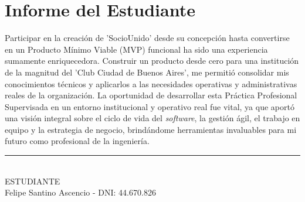 \section{Informe del Estudiante}

Participar en la creación de 'SocioUnido' desde su concepción hasta convertirse en un Producto Mínimo Viable (MVP) funcional ha sido una experiencia sumamente enriquecedora. Construir un producto desde cero para una institución de la magnitud del 'Club Ciudad de Buenos Aires', me permitió consolidar mis conocimientos técnicos y aplicarlos a las necesidades operativas y administrativas reales de la organización. La oportunidad de desarrollar esta Práctica Profesional Supervisada en un entorno institucional y operativo real fue vital, ya que aportó una visión integral sobre el ciclo de vida del \textit{software}, la gestión ágil, el trabajo en equipo y la estrategia de negocio, brindándome herramientas invaluables para mi futuro como profesional de la ingeniería.

\vspace{1.5cm}
\noindent\rule{8cm}{0.4pt} \\
ESTUDIANTE \\
Felipe Santino Ascencio - DNI: 44.670.826

